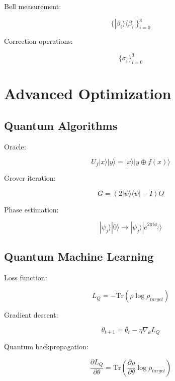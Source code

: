 \documentclass[12pt]{article}
\newcommand{\tr}{\text{Tr}}
\begin{document}
Bell measurement:

\begin{equation}
\{|\beta_i\rangle\langle\beta_i|\}_{i=0}^3
\end{equation}

Correction operations:

\begin{equation}
\{\sigma_i\}_{i=0}^3
\end{equation}

\section{Advanced Optimization}

\subsection{Quantum Algorithms}

Oracle:

\begin{equation}
U_f|x\rangle|y\rangle = |x\rangle|y\oplus f(x)\rangle
\end{equation}

Grover iteration:

\begin{equation}
G = (2|\psi\rangle\langle\psi| - I)O
\end{equation}

Phase estimation:

\begin{equation}
|\psi_j\rangle|0\rangle \rightarrow |\psi_j\rangle|e^{2\pi i\phi_j}\rangle
\end{equation}

\subsection{Quantum Machine Learning}

Loss function:

\begin{equation}
L_Q = -\tr(\rho \log \rho_{target})
\end{equation}

Gradient descent:

\begin{equation}
\theta_{t+1} = \theta_t - \eta\nabla_\theta L_Q
\end{equation}

Quantum backpropagation:

\begin{equation}
\frac{\partial L_Q}{\partial \theta} = \tr\left(\frac{\partial \rho}{\partial \theta}\log \rho_{target}\right)
\end{equation}
\end{document}
